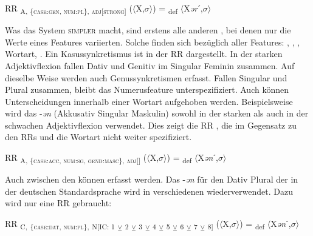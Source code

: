 \begin{exe}
\begin{exe}
\begin{exe}%
RR \textsubscript{A, \{\textsc{case:gen}, \textsc{num:pl}\}, \textsc{adj[strong]}} ($\langle$X,$\sigma$$\rangle$) = \textsubscript{def} $\langle$X\textit{ər}ˊ,$\sigma$$\rangle$
\end{exe}

Was das System \textsc{simpler} macht, sind erstens alle anderen , bei denen nur die Werte eines Features variierten. Solche  finden sich bezüglich aller Features: , , , Wortart, . Ein Kasussynkretismus ist in der RR  dargestellt. In der starken Adjektivflexion fallen Dativ und Genitiv im Singular Feminin zusammen. Auf dieselbe Weise werden auch Genussynkretismen erfasst. Fallen Singular und Plural zusammen, bleibt das Numerusfeature unterspezifiziert. Auch können Unterscheidungen innerhalb einer Wortart aufgehoben werden. Beispielsweise wird das  -\textit{ən} (Akkusativ Singular Maskulin) sowohl in der starken als auch in der schwachen Adjektivflexion verwendet. Dies zeigt die RR , die im Gegensatz zu den RRs  und  die Wortart nicht weiter spezifiziert.\\

\begin{exe}%
RR \textsubscript{A, \{\textsc{case:acc}, \textsc{num:sg}, \textsc{gend:masc}\}, \textsc{adj[]}} ($\langle$X,$\sigma$$\rangle$) = \textsubscript{def} $\langle$X\textit{ən}ˊ,$\sigma$$\rangle$
    \end{exe}
   

Auch  zwischen den  können erfasst werden. Das  -\textit{ən} für den Dativ Plural der  in der deutschen Standardsprache wird in verschiedenen  wiederverwendet. Dazu wird nur eine RR  gebraucht:

\begin{exe}%
RR \textsubscript{C,} \textsubscript{\{\textsc{case:dat}, \textsc{num:pl}\},} \textsubscript{N[IC: 1} \textsubscript{${\veebar}$}\textsubscript{ 2} \textsubscript{${\veebar}$}\textsubscript{ 3} \textsubscript{${\veebar}$}\textsubscript{ 4} \textsubscript{${\veebar}$}\textsubscript{ 5} \textsubscript{${\veebar}$}\textsubscript{ 6} \textsubscript{${\veebar}$}\textsubscript{ 7} \textsubscript{${\veebar}$}\textsubscript{ 8]} ($\langle$X,$\sigma$$\rangle$) = \textsubscript{def} $\langle$X\textit{ən}ˊ,$\sigma$$\rangle$
\end{exe}


\end{exe}
\end{exe}
